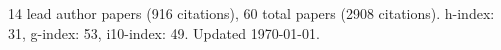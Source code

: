 14 lead author papers (916 citations),
60 total papers (2908 citations).\newline
h-index: 31, g-index: 53, i10-index: 49. Updated \today.